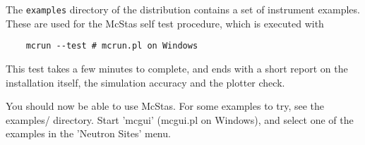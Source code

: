 The \verb+examples+ directory of the distribution contains a set of instrument examples. These are used for the McStas self test procedure, which is executed with
\begin{verbatim}
    mcrun --test # mcrun.pl on Windows
\end{verbatim}
This test takes a few minutes to complete, and ends with a short report on the installation itself, the simulation accuracy and the plotter check.

You should now be able to use McStas. For some examples to try, see the
examples/ directory. Start 'mcgui' (mcgui.pl on Windows), and select one of the examples in the 'Neutron Sites' menu.
